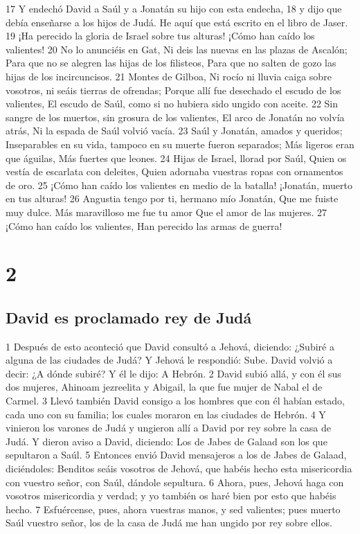 17 Y endechó David a Saúl y a Jonatán su hijo con esta endecha,
18 y dijo que debía enseñarse a los hijos de Judá. He aquí que está escrito en el libro de Jaser.
19 ¡Ha perecido la gloria de Israel sobre tus alturas!
¡Cómo han caído los valientes!
20 No lo anunciéis en Gat,
Ni deis las nuevas en las plazas de Ascalón;
Para que no se alegren las hijas de los filisteos,
Para que no salten de gozo las hijas de los incircuncisos.
21 Montes de Gilboa,
Ni rocío ni lluvia caiga sobre vosotros, ni seáis tierras de ofrendas;
Porque allí fue desechado el escudo de los valientes,
El escudo de Saúl, como si no hubiera sido ungido con aceite.
22 Sin sangre de los muertos, sin grosura de los valientes,
El arco de Jonatán no volvía atrás,
Ni la espada de Saúl volvió vacía.
23 Saúl y Jonatán, amados y queridos;
Inseparables en su vida, tampoco en su muerte fueron separados;
Más ligeros eran que águilas,
Más fuertes que leones.
24 Hijas de Israel, llorad por Saúl,
Quien os vestía de escarlata con deleites,
Quien adornaba vuestras ropas con ornamentos de oro.
25 ¡Cómo han caído los valientes en medio de la batalla!
¡Jonatán, muerto en tus alturas!
26 Angustia tengo por ti, hermano mío Jonatán,
Que me fuiste muy dulce.
Más maravilloso me fue tu amor
Que el amor de las mujeres.
27 ¡Cómo han caído los valientes,
Han perecido las armas de guerra!

\chapter{2}

\section*{David es proclamado rey de Judá}


1 Después de esto aconteció que David consultó a Jehová, diciendo: ¿Subiré a alguna de las ciudades de Judá? Y Jehová le respondió: Sube. David volvió a decir: ¿A dónde subiré? Y él le dijo: A Hebrón. 
2 David subió allá, y con él sus dos mujeres, Ahinoam jezreelita y Abigail, la que fue mujer de Nabal el de Carmel. 
3 Llevó también David consigo a los hombres que con él habían estado, cada uno con su familia; los cuales moraron en las ciudades de Hebrón.
4 Y vinieron los varones de Judá y ungieron allí a David por rey sobre la casa de Judá. Y dieron aviso a David, diciendo: Los de Jabes de Galaad son los que sepultaron a Saúl.
5 Entonces envió David mensajeros a los de Jabes de Galaad, diciéndoles: Benditos seáis vosotros de Jehová, que habéis hecho esta misericordia con vuestro señor, con Saúl, dándole sepultura. 
6 Ahora, pues, Jehová haga con vosotros misericordia y verdad; y yo también os haré bien por esto que habéis hecho.
7 Esfuércense, pues, ahora vuestras manos, y sed valientes; pues muerto Saúl vuestro señor, los de la casa de Judá me han ungido por rey sobre ellos.
